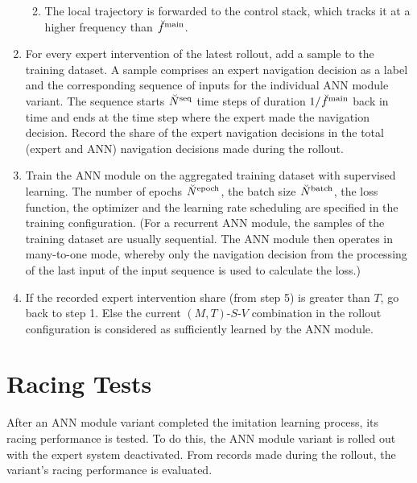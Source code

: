 \begin{enumerate}
\begin{enumerate}
\begin{enumerate}
        \end{enumerate}
        \item The local trajectory is forwarded to the control stack,
        which tracks it at a higher frequency than $\freq[\user]{\main}{}{}{}$.
    \end{enumerate}
    \item For every expert intervention of the latest rollout, 
    add a sample to the training dataset.
    A sample comprises an expert navigation decision as a label
    and the corresponding sequence of inputs
    for the individual ANN module variant.
    The sequence starts $\seqLen$ time steps 
    of duration $1/\freq[\user]{\main}{}{}{}$ 
    back in time and
    ends at the time step where
    the expert made the navigation decision.
    Record the share of the expert navigation decisions 
    in the total (expert and ANN) navigation decisions made during the rollout.
    \item Train the ANN module on the 
    aggregated training dataset with supervised learning.
    The number of epochs $\num[\user]{\text{epoch}}{}{}{}$,
    the batch size $\batchSize$,
    the loss function, the optimizer and the learning rate scheduling
    are specified in the training configuration.
    (For a recurrent ANN module, the samples of the training dataset
    are usually sequential. The ANN module then operates in many-to-one mode,
    whereby only the navigation decision from the processing of the last input 
    of the input sequence is used to calculate the loss.)
    \item If the recorded expert intervention share (from step 5) is greater
    than $T$, go back to step 1. Else the current 
    $(M,T)$-$S$-$V$ combination in the rollout configuration
    is considered as sufficiently learned by the ANN module.
\end{enumerate}

\section{Racing Tests}
After an ANN module variant completed the imitation learning process,
its racing performance is tested.
To do this, the ANN module variant is rolled out
with the expert system deactivated.
From records made during the rollout,
the variant's racing performance is evaluated.


